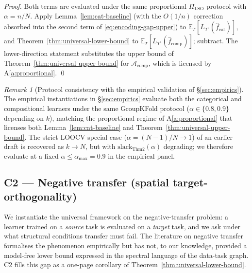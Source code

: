 \documentclass[11pt,a4paper]{article}
\theoremstyle{plain}
\theoremstyle{definition}
\theoremstyle{remark}
\newtheorem{remark}[theorem]{Remark}
\newcommand{\E}{\mathbb{E}}
\newcommand{\Acal}{\mathcal{A}}
\begin{document}
\begin{proof}
Both terms are evaluated under the same proportional
$\Pi_{\mathrm{LSO}}$ protocol with $\alpha = n/N$. Apply
Lemma~\ref{lem:cat-baseline} (with the $O(1/n)$ correction
absorbed into the second term of \eqref{eq:encoding-gap-upper})
to $\E_T[L_{T^c}(\hat f_{\mathrm{cat}})]$, and
Theorem~\ref{thm:universal-lower-bound} to
$\E_T[L_{T^c}(\hat f_{\mathrm{comp}})]$; subtract. The
lower-direction statement substitutes the upper bound of
Theorem~\ref{thm:universal-upper-bound} for $\Acal_{\mathrm{comp}}$,
which is licensed by A\ref{a:proportional}. \qed
\end{proof}

\begin{remark}[Protocol consistency with the empirical validation
of \S\ref{sec:empirics}]
\label{rem:protocol-empirics}
The empirical instantiations in \S\ref{sec:empirics} evaluate both
the categorical and compositional learners under the same
GroupKFold protocol ($\alpha \in \{0.8, 0.9\}$ depending on $k$),
matching the proportional regime of A\ref{a:proportional} that
licenses both Lemma~\ref{lem:cat-baseline} and
Theorem~\ref{thm:universal-upper-bound}. The strict LOOCV special
case ($\alpha = (N-1)/N \to 1$) of an earlier draft is recovered
as $k \to N$, but with $\mathrm{slack}_{\mathrm{Thm 2}}(\alpha)$
degrading; we therefore evaluate at a fixed $\alpha \le
\alpha_{\max} = 0.9$ in the empirical panel.
\end{remark}

\subsection{C2 --- Negative transfer (spatial target-orthogonality)}
\label{subsec:c2}

We instantiate the universal framework on the negative-transfer
problem: a learner trained on a \emph{source} task is evaluated on a
\emph{target} task, and we ask under what structural conditions
transfer must fail.  The literature on negative transfer
\citep{Rosenstein2005,WangDaiPoczos2019,Zhang2022survey} formalises
the phenomenon empirically but has not, to our knowledge, provided a
model-free lower bound expressed in the spectral language of the
data-task graph.  C2 fills this gap as a one-page corollary of
Theorem~\ref{thm:universal-lower-bound}.
\end{document}
